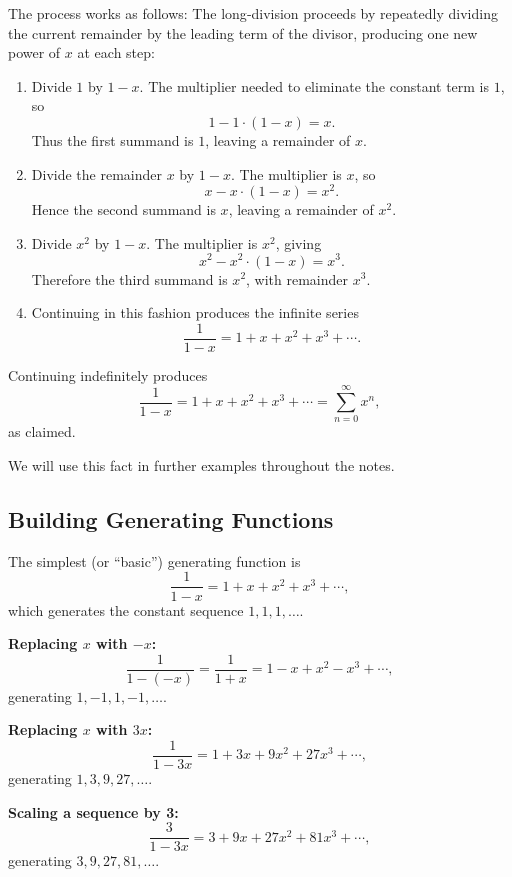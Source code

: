 \documentclass{article}
\begin{document}
The process works as follows:
The long‑division proceeds by repeatedly dividing the current remainder by the leading term of the divisor, producing one new power of \(x\) at each step:

\begin{enumerate}
  \item Divide \(1\) by \(1-x\). The multiplier needed to eliminate the constant term is \(1\), so 
  \[
    1 - 1\cdot(1-x) = x.
  \]
  Thus the first summand is \(1\), leaving a remainder of \(x\).

  \item Divide the remainder \(x\) by \(1-x\). The multiplier is \(x\), so
  \[
    x - x\cdot(1-x) = x^2.
  \]
  Hence the second summand is \(x\), leaving a remainder of \(x^2\).

  \item Divide \(x^2\) by \(1-x\). The multiplier is \(x^2\), giving
  \[
    x^2 - x^2\cdot(1-x) = x^3.
  \]
  Therefore the third summand is \(x^2\), with remainder \(x^3\).

  \item Continuing in this fashion produces the infinite series
  \[
    \frac{1}{1-x} = 1 + x + x^2 + x^3 + \cdots.
  \]
\end{enumerate}


Continuing indefinitely produces
\[
\frac{1}{1-x} = 1 + x + x^2 + x^3 + \cdots = \sum_{n=0}^\infty x^n,
\]
as claimed. \par
\noindent We will use this fact in further examples throughout the notes.

\subsection*{Building Generating Functions}

The simplest (or “basic”) generating function is
\[
\frac{1}{1-x} = 1 + x + x^2 + x^3 + \cdots,
\]
which generates the constant sequence \(1,1,1,\dots\).

\medskip
\noindent
\textbf{Replacing \(x\) with \(-x\):}
\[
\frac{1}{1-(-x)} = \frac{1}{1+x} = 1 - x + x^2 - x^3 + \cdots,
\]
generating \(1,-1,1,-1,\dots\).

\medskip
\noindent
\textbf{Replacing \(x\) with \(3x\):}
\[
\frac{1}{1-3x} = 1 + 3x + 9x^2 + 27x^3 + \cdots,
\]
generating \(1,3,9,27,\dots\).

\medskip
\noindent
\textbf{Scaling a sequence by 3:}
\[
\frac{3}{1-3x} = 3 + 9x + 27x^2 + 81x^3 + \cdots,
\]
generating \(3,9,27,81,\dots\).
\end{document}
